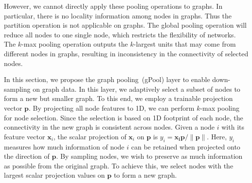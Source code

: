 \documentclass{article}
\begin{document}
However, we cannot directly apply these pooling operations to
graphs. In particular, there is no locality information among nodes
in graphs. Thus the partition operation is not applicable on graphs. The
global pooling operation will reduce all nodes to one single node, which
restricts the flexibility of networks. The $k$-max pooling operation
outputs the $k$-largest units that may come from different nodes in graphs,
resulting in inconsistency in the connectivity of selected nodes.

In this section, we propose the graph pooling~(gPool) layer to
enable down-sampling on graph data. In this layer, we adaptively
select a subset of nodes to form a new but smaller graph. To this
end, we employ a trainable projection vector $\mathbf{p}$. By
projecting all node features to 1D, we can perform $k$-max pooling
for node selection. Since the selection is based on 1D footprint of
each node, the connectivity in the new graph is consistent across
nodes. Given a node $i$ with its feature vector $\mathbf{x}_i$, the
scalar projection of $\mathbf{x}_i$ on $\mathbf{p}$ is $y_i =
\mathbf{x_i} \mathbf{p} / \lVert \mathbf{p} \rVert$. Here, $y_i$
measures how much information of node $i$ can be retained when
projected onto the direction of $\mathbf{p}$. By sampling nodes, we
wish to preserve as much information as possible from the original
graph. To achieve this, we select nodes with the largest scalar
projection values on $\mathbf{p}$ to form a new graph.
\end{document}
